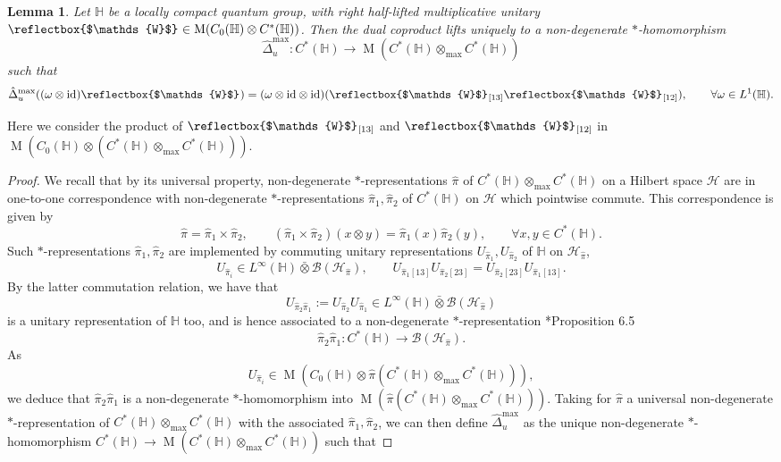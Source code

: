 \documentclass[reqno]{amsart}
\numberwithin{equation}{section}
\newtheorem{Lem}[Theorem]{Lemma}
\newcommand{\mcB}{\mathcal{B}}
\newcommand{\id}{\mathrm{id}}
\newcommand{\Hsp}{\mathcal{H}}
\newcommand{\Hh}{\mathbb{H}}
\newcommand{\Mult}{\operatorname{M}}
\newcommand{\Ww}{\mathds{W}}
\newcommand{\wW}{\text{\reflectbox{$\Ww$}}\:\!}
\begin{document}
\begin{Lem}\label{lemma3}
Let $\Hh$ be a locally compact quantum group, with right half-lifted multiplicative unitary $\wW \in \Mult(C_0(\Hh)\otimes C^*(\Hh))$. Then the dual coproduct lifts uniquely to a non-degenerate $*$-homomorphism
\[
\hat{\Delta}_u^{\max}\colon C^*(\Hh) \rightarrow \Mult(C^*(\Hh)\otimes_{\max}C^*(\Hh))
\]
such that 
\begin{equation}\label{EqFormulaMaxCo}
\hat{\Delta}_u^{\max}((\omega \otimes \id)\wW) = (\omega \otimes \id\otimes \id)(\wW_{[13]}\wW_{[12]}), \qquad \forall \omega \in L^1(\Hh).
\end{equation}
\end{Lem} 
Here we consider the product of $\wW_{[13]}$ and $\wW_{[12]}$ in $\Mult(C_0(\Hh) \otimes (C^*(\Hh)\otimes_{\max}C^*(\Hh)))$. 
\begin{proof}
We recall that by its universal property, non-degenerate $*$-representations $\hat{\pi}$ of $C^*(\Hh)\otimes_{\max}C^*(\Hh)$ on a Hilbert space $\Hsp$ are in one-to-one correspondence with non-degenerate $*$-representations $\hat{\pi}_1,\hat{\pi}_2$ of $C^*(\Hh)$ on $\Hsp$ which pointwise commute. This correspondence is given by
\[
\hat{\pi} = \hat{\pi}_1 \times \hat{\pi}_2,\qquad (\hat{\pi}_1\times\hat{\pi}_2)(x\otimes y) = \hat{\pi}_1(x)\hat{\pi}_2(y),\qquad \forall x,y\in C^*(\Hh).
\]
Such $*$-representations $\hat{\pi}_1,\hat{\pi}_2$ are implemented by commuting unitary representations $U_{\hat{\pi}_1},U_{\hat{\pi}_2}$ of $\Hh$ on $\Hsp_{\hat{\pi}}$, 
\[
U_{\hat{\pi}_i} \in L^{\infty}(\Hh) \bar{\otimes} \mcB(\Hsp_{\hat{\pi}}),\qquad U_{\hat{\pi}_1[13]}U_{\hat{\pi}_2[23]} = U_{\hat{\pi}_2[23]}U_{\hat{\pi}_1[13]}.
\]
By the latter commutation relation, we have that 
\[
U_{\hat{\pi}_2\hat{\pi}_1} := U_{\hat{\pi}_2}U_{\hat{\pi}_1}\in L^{\infty}(\Hh)\bar{\otimes} \mcB(\Hsp_{\hat{\pi}})
\]
is a unitary representation of $\Hh$ too, and is hence associated to a non-degenerate $*$-representation \cite{Kus01}*{Proposition 6.5}
\[
\hat{\pi}_2\hat{\pi}_1\colon C^*(\Hh) \rightarrow \mcB(\Hsp_{\hat{\pi}}). 
\]
As 
\[
U_{\hat{\pi}_i} \in \Mult(C_0(\Hh)\otimes \hat{\pi}(C^*(\Hh)\otimes_{\max}C^*(\Hh))),
\]
we deduce that $\hat{\pi}_2\hat{\pi}_1$ is a non-degenerate $*$-homomorphism into $\Mult(\hat{\pi}(C^*(\Hh)\otimes_{\max}C^*(\Hh)))$. Taking for $\hat{\pi}$ a universal non-degenerate $*$-representation of $C^*(\Hh)\otimes_{\max}C^*(\Hh)$ with the associated $\hat{\pi}_1,\hat{\pi}_2$, we can then define $\hat{\Delta}_u^{\max}$ as the unique non-degenerate $*$-homomorphism $C^*(\Hh) \rightarrow \Mult(C^*(\Hh)\otimes_{\max}C^*(\Hh))$  such that 

\end{proof}
\end{document}
